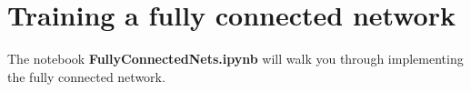 \section{Training a fully connected network}

The notebook \textbf{FullyConnectedNets.ipynb} will walk you through implementing the fully connected network.